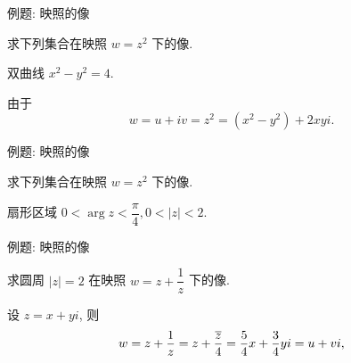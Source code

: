 \begin{frame}{例题: 映照的像}
\onslide<+->
\begin{example}
求下列集合在映照 $w=z^2$ 下的像.

 双曲线 $x^2-y^2=4$.
\end{example}
\onslide<+->
\begin{solution*}
由于 \[w=u+iv=z^2=(x^2-y^2)+2xyi.\]

\end{solution*}
\end{frame}


\begin{frame}{例题: 映照的像}
\onslide<+->
\begin{example}
求下列集合在映照 $w=z^2$ 下的像.

 扇形区域 $0<\arg z<\dfrac\pi4,0<|z|<2$.
\end{example}
\onslide<+->
\begin{solution}
\end{solution}
\end{frame}


\begin{frame}{例题: 映照的像}
\onslide<+->
\begin{example}
求圆周 $|z|=2$ 在映照 $w=z+\dfrac1z$ 下的像.
\end{example}
\onslide<+->
\begin{solution}
设 $z=x+yi$, 则
\[w=z+\frac1z=z+\frac{\overline z}4=\frac54x+\frac34yi=u+vi,\]
\vspace{-0.2\baselineskip}
\onslide<+->{
\[x=\frac45u,\quad y=\frac43v,\quad \left(\frac45u\right)^2+\left(\frac43v\right)^2=4,\]}
\vspace{-0.2\baselineskip}
\onslide<+->{
\[\left(\frac{2u}5\right)^2+\left(\frac{2v}3\right)^2=1.\]}
\vspace{-0.2\baselineskip}
\end{solution}
\end{frame}

